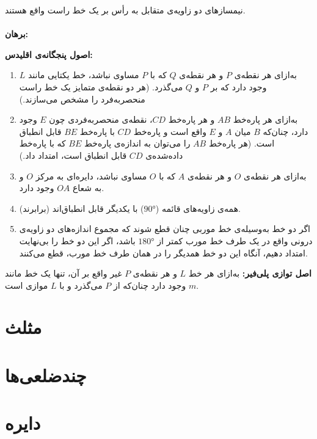 \begin{theorem}
	نیمسازهای دو زاویه‌ی متقابل به رأس بر یک خط راست واقع هستند.
	\\ \dfth \\
	\textbf{برهان:}
	
\end{theorem}
\bigskip
\textbf{اصول پنجگانه‌ی اقلیدس:}
\begin{enumerate}
	\item 
	به‌ازای هر نقطه‌ی $P$ و هر نقطه‌ی $Q$ که با $P$ مساوی نباشد، خط یکتایی مانند $L$ وجود دارد که بر $P$ و $Q$ می‌گذرد. (هر دو نقطه‌ی متمایز یک خط راست منحصربه‌فرد را مشخص می‌سازند.)
	\item 
	به‌ازای هر پاره‌خط $AB$ و هر پاره‌خط $CD$، نقطه‌ی منحصربه‌فردی چون $E$ وجود دارد، چنان‌که $B$ میان $A$ و $E$ واقع است و پاره‌خط $CD$ با پاره‌خط $BE$ قابل انطباق است. (هر پاره‌خط $AB$ را می‌توان به اندازه‌ی پاره‌خط $BE$ که با پاره‌خط داده‌شده‌ی $CD$ قابل انطباق است، امتداد داد.)
	\item 
	به‌ازای هر نقطه‌ی $O$ و هر نقطه‌ی $A$ که با $O$ مساوی نباشد، دایره‌ای به مرکز $O$ و به شعاع $OA$ وجود دارد.
	\item 
	همه‌ی زاویه‌های قائمه
	($\ang{90}$)
	با یکدیگر قابل انطباق‌اند (برابرند).
	\item 
	اگر دو خط به‌وسیله‌ی خط موربی چنان قطع شوند که مجموع اندازه‌های دو زاویه‌ی درونی واقع در یک طرف خط مورب کمتر از
	$\ang{180}$
	باشد، اگر این دو خط را بی‌نهایت امتداد دهیم، آنگاه این دو خط همدیگر را در همان طرف خط مورب، قطع می‌کنند.
\end{enumerate}
\smallskip
\textbf{اصل توازی پلی‌فیر:}
به‌ازای هر خط $L$ و هر نقطه‌ی $P$ غیر واقع بر آن، تنها یک خط مانند $m$ وجود دارد چنان‌که از $P$ می‌گذرد و با $L$ موازی است.

\section{مثلث}

\section{چندضلعی‌ها}

\section{دایره}
